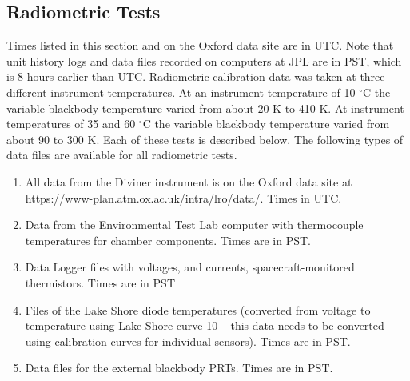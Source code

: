 \subsection{Radiometric Tests}
Times listed in this section and on the Oxford data site are in UTC.
Note that unit history logs and data files recorded on computers at JPL are in PST, which is 8 hours earlier than UTC.
Radiometric calibration data was taken at three different instrument temperatures.
At an instrument temperature of 10 $^\circ$C the variable blackbody temperature varied from about 20 K to 410 K.
At instrument temperatures of 35 and 60 $^\circ$C the variable blackbody temperature varied from about 90 to 300 K.
Each of these tests is described below.
The following types of data files are available for all radiometric tests.

\begin{enumerate}
\item All data from the Diviner instrument is on the Oxford data site at https://www-plan.atm.ox.ac.uk/intra/lro/data/. Times in UTC.
\item Data from the Environmental Test Lab computer with thermocouple temperatures for chamber components. Times are in PST.
\item Data Logger files with voltages, and currents, spacecraft-monitored thermistors. Times are in PST
\item Files of the Lake Shore diode temperatures (converted from voltage to temperature using Lake Shore curve 10 – this data needs to be converted using calibration curves for individual sensors). Times are in PST.
\item Data files for the external blackbody PRTs. Times are in PST.
\end{enumerate}


